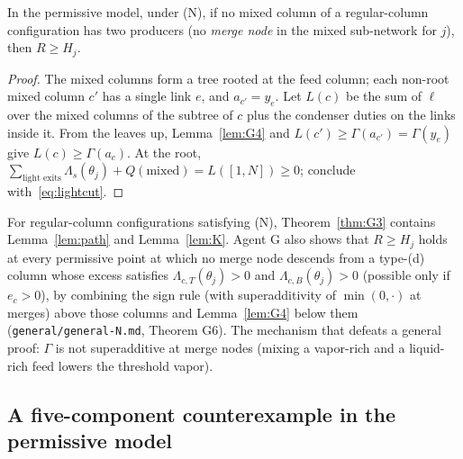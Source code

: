 \documentclass[11pt,a4paper]{report}
\newcommand{\Lam}{\Lambda}
\begin{document}
\begin{theorem}\label{thm:G3}
In the permissive model, under (N), if no mixed column of a regular-column configuration has two producers (no
\emph{merge node} in the mixed sub-network for $j$), then $R\ge H_j$.
\end{theorem}
\begin{proof}
The mixed columns form a tree rooted at the feed column; each non-root mixed column $c'$ has a single link $e$, and
$a_{c'}=y_e$. Let $L(c)$ be the sum of $\ell$ over the mixed columns of the subtree of $c$ plus the condenser duties
on the links inside it. From the leaves up, Lemma~\ref{lem:G4} and $L(c')\ge\Gamma(a_{c'})=\Gamma(y_e)$ give
$L(c)\ge\Gamma(a_c)$. At the root, $\sum_{\text{light exits}}\Lam_s(\theta_j)+Q(\text{mixed})=L([1,N])\ge0$; conclude
with~\eqref{eq:lightcut}.
\end{proof}

\noindent For regular-column configurations satisfying (N), Theorem~\ref{thm:G3} contains Lemma~\ref{lem:path} and Lemma~\ref{lem:K}. Agent G also shows that
$R\ge H_j$ holds at every permissive point at which no merge node descends from a type-(d) column whose excess
satisfies $\Lam_{c,T}(\theta_j)>0$ and $\Lam_{c,B}(\theta_j)>0$ (possible only if $e_c>0$), by combining the sign rule (with superadditivity of $\min(0,\cdot)$
at merges) above those columns and Lemma~\ref{lem:G4} below them (\texttt{general/general-N.md}, Theorem G6). The
mechanism that defeats a general proof: $\Gamma$ is not superadditive at merge nodes (mixing a vapor-rich and a
liquid-rich feed lowers the threshold vapor).

\subsection{A five-component counterexample in the permissive model}\label{sec:cex}
\end{document}
